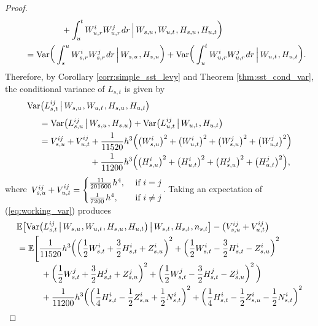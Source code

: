 \documentclass[sn-mathphys-num]{sn-jnl}%
\newcommand{\E}{\mathbb{E}}
\newcommand{\m}{\hspace{0.25mm}}
\newcommand{\mm}{\hspace{5mm}}
\newcommand{\mmm}{\hspace{10mm}}
\newcommand{\var}{\mathrm{Var}}
\begin{document}
\begin{proof}
\begin{align*}
&\hspace{20mm} + \int_u^t W_{u,r}^i W_{u,r}^j\m dr\,\Big|\, W_{s,u}\m, W_{u,t}\m, H_{s,u}\m, H_{u,t}\bigg)\\
&\mm = \var\bigg(\int_s^u W_{s,r}^i W_{s,r}^j\m dr \,\Big|\, W_{s,u}\m, H_{s,u}\bigg) + \var\bigg(\int_u^t W_{u,r}^i W_{u,r}^j\m dr \,\Big|\, W_{u,t}\m, H_{u,t}\bigg).
\end{align*}
Therefore, by Corollary \ref{corr:simple_sst_levy} and Theorem \ref{thm:sst_cond_var}, the conditional variance of $L_{s,t}$ is given by
\begin{align}\label{eq:working_var}
&\var\big(L_{s,t}^{ij}\,\big|\, W_{s,u}\m, W_{u,t}\m, H_{s,u}\m, H_{u,t}\big)\\[3pt]
&\mm = \var\big(L_{s,u}^{ij}\,\big|\, W_{s,u}\m, H_{s,u}\big) + \var\big(L_{u,t}^{ij}\,\big|\, W_{u,t}\m, H_{u,t}\big)\nonumber\\
&\mm = V_{s,u}^{ij} + V_{u,t}^{ij} + \frac{1}{11520}h^3\Big(\big(W_{s,u}^i\big)^2 + \big(W_{u,t}^i\big)^2 + \big(W_{s,u}^j\big)^2 + \big(W_{u,t}^j\big)^2\Big)\nonumber\\
&\hspace{25.75mm} + \frac{1}{11200}h^3 \Big(\big(H_{s,u}^i\big)^2 + \big(H_{u,t}^i\big)^2 + \big(H_{s,u}^j\big)^2 + \big(H_{u,t}^j\big)^2\Big),\nonumber
\end{align}
where $\, V_{s,u}^{ij} + V_{u,t}^{ij} = \begin{cases} \frac{11}{201600}\m h^4, & \text{ if } i = j\\[3pt]
\frac{1}{7200}\m h^4, & \text{ if } i\neq j\end{cases}$. Taking an expectation of (\ref{eq:working_var}) produces
\begin{align*}
&\E\big[\var\big(L_{s,t}^{ij}\,\big|\, W_{s,u}\m, W_{u,t}\m, H_{s,u}\m, H_{u,t}\big)\,\big|\,W_{s,t}\m, H_{s,t}\m, n_{s,t}\big] - \big(V_{s,u}^{ij} + V_{u,t}^{ij}\big)\\
& = \E\Bigg[\frac{1}{11520}h^3\bigg(\bigg(\frac{1}{2}W_{s,t}^i + \frac{3}{2}H_{s,t}^i + Z_{s,u}^i\bigg)^2 + \bigg(\frac{1}{2}W_{s,t}^i - \frac{3}{2}H_{s,t}^i - Z_{s,u}^i\bigg)^2\\[-3pt]
&\mmm + \bigg(\frac{1}{2}W_{s,t}^j + \frac{3}{2}H_{s,t}^j + Z_{s,u}^j\bigg)^2 + \bigg(\frac{1}{2}W_{s,t}^j - \frac{3}{2}H_{s,t}^j - Z_{s,u}^j\bigg)^2\,\bigg)\\[-3pt]
&\mmm + \frac{1}{11200}h^3 \bigg(\bigg(\frac{1}{4}H_{s,t}^i - \frac{1}{2}Z_{s,u}^i + \frac{1}{2}N_{s,t}^i\bigg)^2 + \bigg(\frac{1}{4}H_{s,t}^i - \frac{1}{2}Z_{s,u}^i - \frac{1}{2}N_{s,t}^i\bigg)^2\\[-3pt]

\end{align*}
\end{proof}
\end{document}

